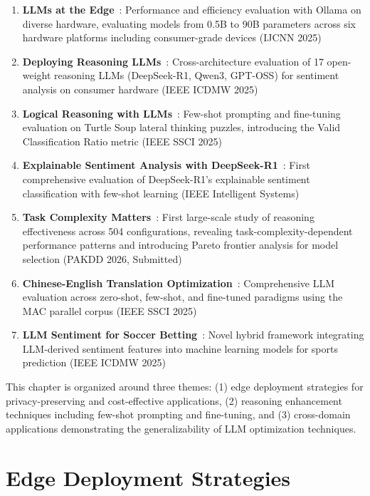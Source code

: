 \begin{enumerate}[leftmargin=*]
    \item \textbf{LLMs at the Edge}~\cite{huang2025edge}: Performance and efficiency evaluation with Ollama on diverse hardware, evaluating models from 0.5B to 90B parameters across six hardware platforms including consumer-grade devices (IJCNN 2025)
    \item \textbf{Deploying Reasoning LLMs}~\cite{huang2025reasoning_deployment}: Cross-architecture evaluation of 17 open-weight reasoning LLMs (DeepSeek-R1, Qwen3, GPT-OSS) for sentiment analysis on consumer hardware (IEEE ICDMW 2025)
    \item \textbf{Logical Reasoning with LLMs}~\cite{huang2025logical}: Few-shot prompting and fine-tuning evaluation on Turtle Soup lateral thinking puzzles, introducing the Valid Classification Ratio metric (IEEE SSCI 2025)
    \item \textbf{Explainable Sentiment Analysis with DeepSeek-R1}~\cite{huang2025deepseek}: First comprehensive evaluation of DeepSeek-R1's explainable sentiment classification with few-shot learning (IEEE Intelligent Systems)
    \item \textbf{Task Complexity Matters}~\cite{huang2026complexity}: First large-scale study of reasoning effectiveness across 504 configurations, revealing task-complexity-dependent performance patterns and introducing Pareto frontier analysis for model selection (PAKDD 2026, Submitted)
    \item \textbf{Chinese-English Translation Optimization}~\cite{huang2025translation}: Comprehensive LLM evaluation across zero-shot, few-shot, and fine-tuned paradigms using the MAC parallel corpus (IEEE SSCI 2025)
    \item \textbf{LLM Sentiment for Soccer Betting}~\cite{samuel2025soccer}: Novel hybrid framework integrating LLM-derived sentiment features into machine learning models for sports prediction (IEEE ICDMW 2025)
\end{enumerate}

This chapter is organized around three themes: (1) edge deployment strategies for privacy-preserving and cost-effective applications, (2) reasoning enhancement techniques including few-shot prompting and fine-tuning, and (3) cross-domain applications demonstrating the generalizability of LLM optimization techniques.

\section{Edge Deployment Strategies}
\label{sec:edge_deployment}

